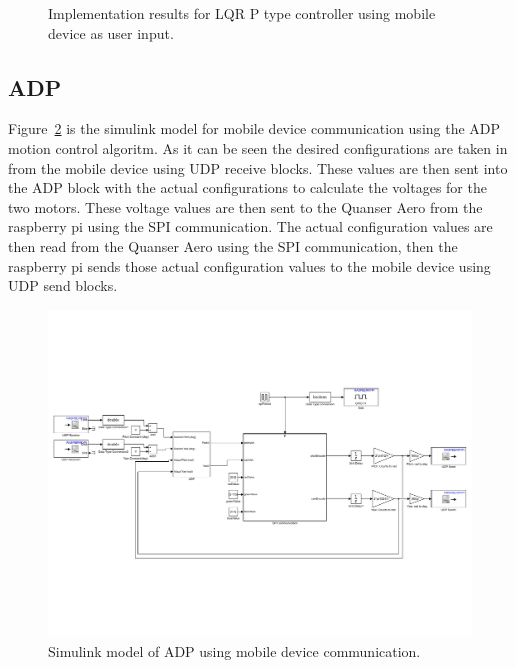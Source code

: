\begin{figure}
{    \label{fig:AndroidLQRPitchVolt}
    }
    \caption{Implementation results for LQR P type controller using mobile device as user input.}
    \label{fig:AndroidLQR}
\end{figure}


\subsection{ADP}
Figure~\ref{fig:ADP_Android} is the simulink model for mobile device communication using the ADP motion control algoritm.  As it can be seen the desired configurations are taken in from the mobile device using UDP receive blocks.  These values are then sent into the ADP block with the actual configurations to calculate the voltages for the two motors.  These voltage values are then sent to the Quanser Aero from the raspberry pi using the SPI communication.  The actual configuration values are then read from the Quanser Aero using the SPI communication, then the raspberry pi sends those actual configuration values to the mobile device using UDP send blocks.
\begin{figure}[!htbp]
    \centering
    \includegraphics[width=.72\textwidth,keepaspectratio=true]{figs/img/ADP_Android}
    \caption{Simulink model of ADP using mobile device communication.}
    \label{fig:ADP_Android}
\end{figure}

